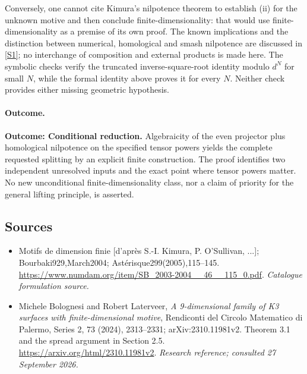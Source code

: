 \documentclass[11pt,a4paper]{article}
\newcommand{\sref}[2]{\hyperlink{source:#1:#2}{[S#2]}}
\numberwithin{equation}{section}
\begin{document}
Conversely, one cannot cite Kimura's nilpotence theorem to establish (ii) for the unknown motive and then conclude finite-dimensionality: that would use finite-dimensionality as a premise of its own proof. The known implications and the distinction between numerical, homological and smash nilpotence are discussed in \sref{30006782}{1}; no interchange of composition and external products is made here. The symbolic checks verify the truncated inverse-square-root identity modulo $d^N$ for small $N$, while the formal identity above proves it for every $N$. Neither check provides either missing geometric hypothesis.

\paragraph{Outcome.}
\textbf{Outcome: Conditional reduction.}
Algebraicity of the even projector plus homological nilpotence on the specified tensor powers yields the complete requested splitting by an explicit finite construction. The proof identifies two independent unresolved inputs and the exact point where tensor powers matter. No new unconditional finite-dimensionality class, nor a claim of priority for the general lifting principle, is asserted.

\subsection{Sources}
\begin{itemize}\raggedright
\item[\textnormal{[S1]}]\hypertarget{source:30006782:1}{} Motifs de dimension finie [d'après S.-I. Kimura, P. O'Sullivan, ...]; Bourbaki929,March2004; Astérisque299(2005),115–145.
\url{https://www.numdam.org/item/SB_2003-2004__46__115_0.pdf}.
{\small\textit{Catalogue formulation source.}}
\item[\textnormal{[E1]}]\hypertarget{extra:30006782:1}{} Michele Bolognesi and Robert Laterveer, \emph{A 9-dimensional family of K3 surfaces with finite-dimensional motive}, Rendiconti del Circolo Matematico di Palermo, Series 2, 73 (2024), 2313--2331; arXiv:2310.11981v2. Theorem 3.1 and the spread argument in Section 2.5.
\url{https://arxiv.org/html/2310.11981v2}.
{\small\textit{Research reference; consulted 27 September 2026.}}
\end{itemize}
\end{document}
